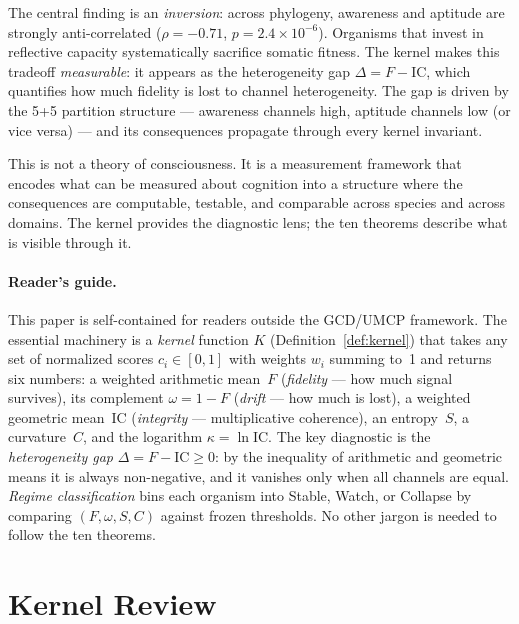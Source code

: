 \documentclass[
  aps,
  prd,
  twocolumn,
  superscriptaddress,
  nofootinbib,
  floatfix
]{revtex4-2}
\newcommand{\IC}{\mathrm{IC}}
\begin{document}
The central finding is an \emph{inversion}: across phylogeny,
awareness and aptitude are strongly anti-correlated
($\rho = -0.71$, $p = 2.4 \times 10^{-6}$).  Organisms
that invest in reflective capacity systematically sacrifice
somatic fitness.  The kernel makes this tradeoff
\emph{measurable}: it appears as the heterogeneity gap
$\Delta = F - \IC$, which quantifies how much fidelity
is lost to channel heterogeneity.  The gap is driven by the
5+5 partition structure --- awareness channels high, aptitude
channels low (or vice versa) --- and its consequences propagate
through every kernel invariant.

This is not a theory of consciousness.  It is a measurement
framework that encodes what can be measured about cognition
into a structure where the consequences are computable,
testable, and comparable across species and across domains.
The kernel provides the diagnostic lens; the ten theorems
describe what is visible through it.

\paragraph*{Reader's guide.}
This paper is self-contained for readers outside the GCD/UMCP
framework.  The essential machinery is a \emph{kernel}
function $K$ (Definition~\ref{def:kernel}) that takes any
set of normalized scores $c_i \in [0,1]$ with weights
$w_i$ summing to~1 and returns six numbers: a weighted
arithmetic mean~$F$ (\emph{fidelity} --- how much signal
survives), its complement $\omega = 1 - F$
(\emph{drift} --- how much is lost), a weighted geometric
mean~$\IC$ (\emph{integrity} --- multiplicative coherence),
an entropy~$S$, a curvature~$C$, and the logarithm
$\kappa = \ln\IC$.  The key diagnostic is the
\emph{heterogeneity gap} $\Delta = F - \IC \geq 0$:
by the inequality of arithmetic and geometric means it is
always non-negative, and it vanishes only when all channels
are equal.  \emph{Regime classification} bins each organism
into Stable, Watch, or Collapse by comparing $(F, \omega,
S, C)$ against frozen thresholds.  No other jargon is needed
to follow the ten theorems.

\section{Kernel Review}\label{sec:kernel}
\end{document}

